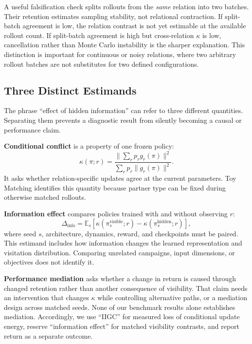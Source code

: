 \documentclass[letterpaper]{article}
\begin{document}
A useful falsification check splits rollouts from the \emph{same} relation into two batches.
Their retention estimates sampling stability, not relational contraction.
If split-batch agreement is low, the relation contrast is not yet estimable at the available rollout count.
If split-batch agreement is high but cross-relation $\kappa$ is low, cancellation rather than Monte Carlo instability is the sharper explanation.
This distinction is important for continuous or noisy relations, where two arbitrary rollout batches are not substitutes for two defined configurations.

\subsection{Three Distinct Estimands}

The phrase ``effect of hidden information'' can refer to three different quantities.
Separating them prevents a diagnostic result from silently becoming a causal or performance claim.

\textbf{Conditional conflict} is a property of one frozen policy:
\begin{equation}
\kappa(\pi;r)
=
\frac{\|\sum_r p_r g_r(\pi)\|^2}
{\sum_r p_r\|g_r(\pi)\|^2}.
\label{eq:conditional-estimand}
\end{equation}
It asks whether relation-specific updates agree at the current parameters.
Toy Matching identifies this quantity because partner type can be fixed during otherwise matched rollouts.

\textbf{Information effect} compares policies trained with and without observing $r$:
\begin{equation}
\Delta_\mathrm{info}
=
\mathbb{E}_{s}\!\left[\kappa(\pi^{\mathrm{visible}}_s;r)
-\kappa(\pi^{\mathrm{hidden}}_s;r)\right],
\label{eq:info-effect}
\end{equation}
where seed $s$, architecture, dynamics, reward, and checkpoints must be paired.
This estimand includes how information changes the learned representation and visitation distribution.
Comparing unrelated campaigns, input dimensions, or objectives does not identify it.

\textbf{Performance mediation} asks whether a change in return is caused through changed retention rather than another consequence of visibility.
That claim needs an intervention that changes $\kappa$ while controlling alternative paths, or a mediation design across matched seeds.
None of our benchmark results alone establishes mediation.
Accordingly, we use ``IIGC'' for measured loss of conditional update energy, reserve ``information effect'' for matched visibility contrasts, and report return as a separate outcome.
\end{document}
